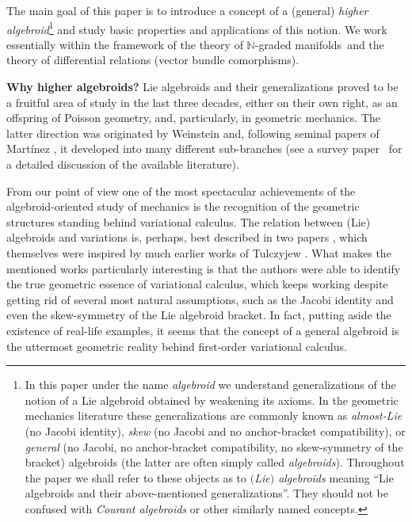 \documentclass[pdftex]{sigma}
\newcommand{\grBs}{{$\N$-graded manifolds}}
\newcommand{\Zakrzewski}{{vector bundle comorphism}}
\newcommand{\N}{\mathbb{N}}
\numberwithin{equation}{section}
\theoremstyle{definition}
\begin{document}
 The main goal of this paper is to introduce a concept of a (general) \emph{higher algebroid}\footnote{In this paper under the name \emph{algebroid} we understand generalizations of the notion of a Lie algebroid obtained by weakening its axioms. In the geometric mechanics literature these generalizations are commonly known as \emph{almost-Lie} (no Jacobi identity), \emph{skew} (no Jacobi and no anchor-bracket compatibility), or \emph{general} (no Jacobi, no anchor-bracket compatibility, no skew-symmetry of the bracket) algebroids (the latter are often simply called \emph{algebroids}). Throughout the paper we shall refer to these objects as to \emph{$($Lie$)$ algebroids} meaning ``Lie algebroids and their above-mentioned generalizations''. They should not be confused with \emph{Courant algebroids} or other similarly named concepts.\label{foot:algebroid}} and study basic properties and applications of this notion. We work essentially within the framework of the theory of \grBs\ and the theory of differential relations (\Zakrzewski s).

{\bf Why higher algebroids?} Lie algebroids and their generalizations proved to be a fruitful area of study in the last three decades, either on their own right, as an offspring of Poisson geometry, and, particularly, in geometric mechanics. The latter direction was originated by Weinstein \cite{Weinstein_1996} and, following seminal papers of Mart\'{i}nez \cite{Martinez_geom_form_mech_lie_alg_2001, Martinez_lagr_mech_lie_alg_2001}, it developed into many different sub-branches (see a survey paper~\cite{Cortes_Inn_survey_2006} for a detailed discussion of the available literature).

From our point of view one of the most spectacular achievements of the algebroid-oriented study of mechanics is the recognition of the geometric structures standing behind variational calculus. The relation between (Lie) algebroids and variations is, perhaps, best described in two papers \cite{GG_var_calc_gen_alg_2008, GGU_geom_mech_alg_2006}, which themselves were inspired by much earlier works of Tulczyjew \cite{Tulczyjew_1976,Tulczyjew_1976a}. What makes the mentioned works particularly interesting is that the authors were able to identify the true geometric essence of variational calculus, which keeps working despite getting rid of several most natural assumptions, such as the Jacobi identity and even the skew-symmetry of the Lie algebroid bracket. In fact, putting aside the existence of real-life examples, it seems that the concept of a general algebroid \cite{JG_PU_Lie_alg_P-N_str_1997, JG_PU_Algebroids_1999} is the uttermost geometric reality behind first-order variational calculus.
\end{document}

